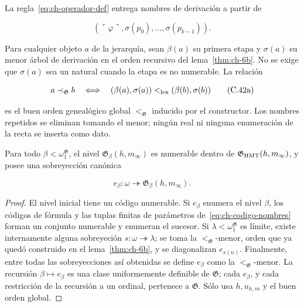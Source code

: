 La regla~\eqref{eq:ch-operador-def} entrega nombres de derivación a partir de

\[
 (\ulcorner\varphi\urcorner,
  \sigma(p_0),\ldots,\sigma(p_{k-1})).
\tag{C.42}\label{eq:ch-codigo-nombres}
\]

Para cualquier objeto \(a\) de la jerarquía, sean \(\beta(a)\) su primera
etapa y \(\sigma(a)\) su menor árbol de derivación en el orden recursivo del
lema~\ref{thm:ch-6b}. No se exige que \(\sigma(a)\) sea un natural cuando la etapa es no
numerable. La relación

\[
 a\prec_{\mathfrak G}b
 \quad\Longleftrightarrow\quad
 (\beta(a),\sigma(a))<_{\rm lex}
 (\beta(b),\sigma(b))
\tag{C.42a}\label{eq:ch-orden-genealogico}
\]

es el buen orden genealógico global \(<_{\mathfrak G}\) inducido por el
constructor. Los nombres repetidos se eliminan tomando el menor; ningún real
ni ninguna enumeración de la recta se inserta como dato.

\begin{lemma}
\label{thm:ch-7}
Para todo
\(\beta<\omega_1^{\mathfrak G}\), el nivel
\(\mathfrak G_\beta(h,m_\infty)\) es numerable dentro de
\(\mathfrak G_{\rm HMT}(h,m_\infty)\), y posee una sobreyección canónica

\[
 e_\beta:\omega\twoheadrightarrow
 \mathfrak G_\beta(h,m_\infty).
\tag{C.43}\label{eq:ch-enumeracion-niveles}
\]

\end{lemma}
\begin{proof}
El nivel inicial tiene un código numerable. Si \(e_\beta\)
enumera el nivel \(\beta\), los códigos de fórmula y las tuplas finitas de
parámetros de~\eqref{eq:ch-codigo-nombres} forman un conjunto numerable y enumeran el sucesor. Si
\(\lambda<\omega_1^{\mathfrak G}\) es límite, existe internamente alguna
sobreyeción \(s:\omega\twoheadrightarrow\lambda\); se toma la
\(<_{\mathfrak G}\)-menor, orden que ya quedó construido en el lema~\ref{thm:ch-6b}, y se
diagonalizan \(e_{s(n)}\). Finalmente, entre todas las sobreyecciones así
obtenidas se define \(e_\beta\) como la \(<_{\mathfrak G}\)-menor. La
recursión \(\beta\mapsto e_\beta\) es una clase uniformemente definible de
\(\mathfrak G\); cada \(e_\beta\), y cada restricción de la recursión a un
ordinal, pertenece a \(\mathfrak G\). Sólo usa \(h,u_{h,m}\) y el buen orden
global.
\end{proof}

